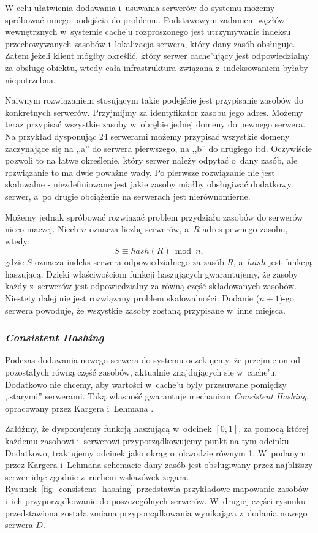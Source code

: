 \documentclass[a4paper,11pt]{scrartcl}
\newcommand{\s}{ }
\newcommand{\keszu}{cache'u}
\newcommand{\keszujacy}{cache'ujący}
\begin{document}
W celu ułatwienia dodawania i~usuwania serwerów do systemu możemy spróbować innego podejścia do problemu. Podstawowym zadaniem węzłów wewnętrznych w~systemie \keszu\s rozproszonego jest utrzymywanie indeksu przechowywanych zasobów i~lokalizacja serwera, który dany zasób obsługuje. Zatem jeżeli klient mógłby określić, który serwer \keszujacy\s jest odpowiedzialny za obsługę obiektu, wtedy cała infrastruktura związana z~indeksowaniem byłaby niepotrzebna.

Naiwnym rozwiązaniem stosującym takie podejście jest przypisanie zasobów do konkretnych serwerów. Przyjmijmy za identyfikator zasobu jego adres. Możemy teraz przypisać wszystkie zasoby w~obrębie jednej domeny do pewnego serwera. Na przykład dysponując 24 serwerami możemy przypisać wszystkie domeny zaczynające się na ,,a'' do serwera pierwszego, na ,,b'' do drugiego itd. Oczywiście pozwoli to na łatwe określenie, który serwer należy odpytać o~dany zasób, ale rozwiązanie to ma dwie poważne wady. Po pierwsze rozwiązanie nie jest skalowalne - niezdefiniowane jest jakie zasoby miałby obsługiwać dodatkowy serwer, a~po drugie obciążenie na serwerach jest nierównomierne.

Możemy jednak spróbować rozwiązać problem przydziału zasobów do serwerów nieco inaczej. Niech $n$ oznacza liczbę serwerów, a~$R$ adres pewnego zasobu, wtedy:
\begin{equation*}
S \equiv hash(R) \bmod n,
\end{equation*}
 gdzie $S$ oznacza indeks serwera odpowiedzialnego za zasób $R$, a~$hash$ jest funkcją haszującą. Dzięki właściwościom funkcji haszujących gwarantujemy, że zasoby każdy z~serwerów jest odpowiedzialny za równą część składowanych zasobów. Niestety dalej nie jest rozwiązany problem skalowalności. Dodanie ($n+1$)-go serwera powoduje, że wszystkie zasoby zostaną przypisane w~inne miejsca.
 
\subsubsection{\textit{Consistent Hashing}}
\label{sect_consistent_hashing}
Podczas dodawania nowego serwera do systemu oczekujemy, że przejmie on od pozostałych równą część zasobów, aktualnie znajdujących się w~\keszu. Dodatkowo nie chcemy, aby wartości w~\keszu\s były przesuwane pomiędzy ,,starymi'' serwerami. Taką własność gwarantuje mechanizm \textit{Consistent Hashing}, opracowany przez Kargera i~Lehmana \cite{karger1997consistent}.

Załóżmy, że dysponujemy funkcją haszującą w~odcinek $[0, 1]$, za pomocą której każdemu zasobowi i~serwerowi przyporządkowujemy punkt na tym odcinku. Dodatkowo, traktujemy odcinek jako okrąg o~obwodzie równym 1. W~podanym przez Kargera i~Lehmana schemacie dany zasób jest obsługiwany przez najbliższy serwer idąc zgodnie z~ruchem wskazówek zegara. Rysunek~\ref{fig_consistent_hashing} przedstawia przykładowe mapowanie zasobów i~ich przyporządkowanie do poszczególnych serwerów. W~drugiej części rysunku przedstawiona została zmiana przyporządkowania wynikająca z~dodania nowego serwera $D$.
\end{document}
